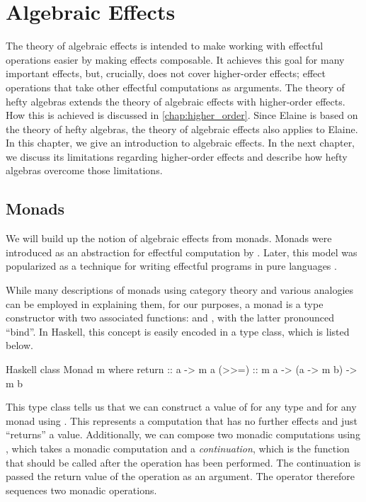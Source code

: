 \chapter{Algebraic Effects}\label{chap:algebraic_effects}

The theory of algebraic effects is intended to make working with effectful operations easier by making effects composable. It achieves this goal for many important effects, but, crucially, does not cover higher-order effects; effect operations that take other effectful computations as arguments. The theory of hefty algebras extends the theory of algebraic effects with higher-order effects. How this is achieved is discussed in \cref{chap:higher_order}. Since Elaine is based on the theory of hefty algebras, the theory of algebraic effects also applies to Elaine. In this chapter, we give an introduction to algebraic effects. In the next chapter, we discuss its limitations regarding higher-order effects and describe how hefty algebras overcome those limitations.

\section{Monads}

We will build up the notion of algebraic effects from monads. Monads were introduced as an abstraction for effectful computation by \textcite{moggi_abstract_1989,moggi_computational_1989}. Later, this model was popularized as a technique for writing effectful programs in pure languages \autocite{wadler_essence_1992,peyton_jones_imperative_1993}.

While many descriptions of monads using category theory and various analogies can be employed in explaining them, for our purposes, a monad is a type constructor  with two associated functions:  and \hs{>>=}, with the latter pronounced ``bind''. In Haskell, this concept is easily encoded in a type class, which is listed below.

\begin{lst}{Haskell}
class Monad m where
  return :: a -> m a
  (>>=)  :: m a -> (a -> m b) -> m b
\end{lst}
%
This type class tells us that we can construct a value of  for any type  and for any monad  using . This represents a computation that has no further effects and just ``returns'' a value. Additionally, we can compose two monadic computations using \hs{>>=}, which takes a monadic computation and a \emph{continuation}, which is the function that should be called after the operation has been performed. The continuation is passed the return value of the operation as an argument. The \hs{>>=} operator therefore sequences two monadic operations.

